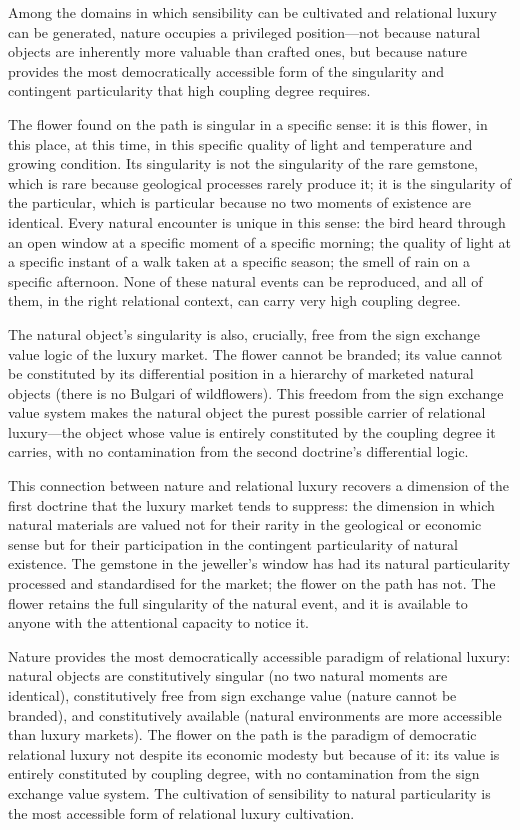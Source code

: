 \noindent
Among the domains in which sensibility can be cultivated and relational luxury can be generated, nature occupies a privileged position---not because natural objects are inherently more valuable than crafted ones, but because nature provides the most democratically accessible form of the singularity and contingent particularity that high coupling degree requires.

The flower found on the path is singular in a specific sense: it is this flower, in this place, at this time, in this specific quality of light and temperature and growing condition. Its singularity is not the singularity of the rare gemstone, which is rare because geological processes rarely produce it; it is the singularity of the particular, which is particular because no two moments of existence are identical. Every natural encounter is unique in this sense: the bird heard through an open window at a specific moment of a specific morning; the quality of light at a specific instant of a walk taken at a specific season; the smell of rain on a specific afternoon. None of these natural events can be reproduced, and all of them, in the right relational context, can carry very high coupling degree.

The natural object's singularity is also, crucially, free from the sign exchange value logic of the luxury market. The flower cannot be branded; its value cannot be constituted by its differential position in a hierarchy of marketed natural objects (there is no Bulgari of wildflowers). This freedom from the sign exchange value system makes the natural object the purest possible carrier of relational luxury---the object whose value is entirely constituted by the coupling degree it carries, with no contamination from the second doctrine's differential logic.

This connection between nature and relational luxury recovers a dimension of the first doctrine that the luxury market tends to suppress: the dimension in which natural materials are valued not for their rarity in the geological or economic sense but for their participation in the contingent particularity of natural existence. The gemstone in the jeweller's window has had its natural particularity processed and standardised for the market; the flower on the path has not. The flower retains the full singularity of the natural event, and it is available to anyone with the attentional capacity to notice it.

\begin{claim}
Nature provides the most democratically accessible paradigm of relational luxury: natural objects are constitutively singular (no two natural moments are identical), constitutively free from sign exchange value (nature cannot be branded), and constitutively available (natural environments are more accessible than luxury markets). The flower on the path is the paradigm of democratic relational luxury not despite its economic modesty but because of it: its value is entirely constituted by coupling degree, with no contamination from the sign exchange value system. The cultivation of sensibility to natural particularity is the most accessible form of relational luxury cultivation.
\end{claim}
